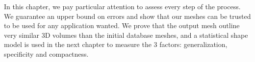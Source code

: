 In this chapter, we pay particular attention to assess every step of the process. We guarantee an upper bound on errors and show that our meshes can be trusted to be used for any application wanted. We prove that the output mesh outline very similar 3D volumes than the initial database meshes, and a statistical shape model is used in the next chapter to measure the 3 factors: generalization, specificity and compactness. 

\vspace*{2cm}



 




 


 
 
 
 
 
